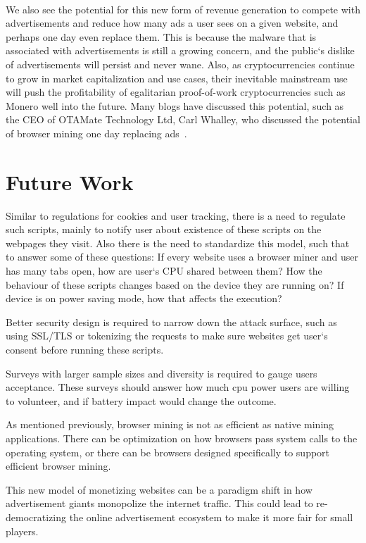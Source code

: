 \\
We also see the potential for this new form of revenue generation to compete with advertisements and reduce how many ads a user sees on a given website, and perhaps one day even replace them. This is because the malware that is associated with advertisements is still a growing concern, and the public`s dislike of advertisements will persist and never wane. Also, as cryptocurrencies continue to grow in market capitalization and use cases, their inevitable mainstream use will push the profitability of egalitarian proof-of-work cryptocurrencies such as Monero well into the future. Many blogs have discussed this potential, such as the CEO of OTAMate Technology Ltd, Carl Whalley, who discussed the potential of browser mining one day replacing ads~\cite{carlcryptoads}.

\section{Future Work}

Similar to regulations for cookies and user tracking, there is a need to regulate such scripts, mainly to notify user about existence of these scripts on the webpages they visit. Also there is the need to standardize this model, such that to answer some of these questions: If every website uses a browser miner and user has many tabs open, how are user`s CPU shared between them? How the behaviour of these scripts changes based on the device they are running on? If device is on power saving mode, how that affects the execution?

Better security design is required to narrow down the attack surface, such as using SSL/TLS or tokenizing the requests to make sure websites get user`s consent before running these scripts. 

Surveys with larger sample sizes and diversity is required to gauge users acceptance. These surveys should answer how much cpu power users are willing to volunteer, and if battery impact would change the outcome.

As mentioned previously, browser mining is not as efficient as native mining applications. There can be optimization on how browsers pass system calls to the operating system, or there can be browsers designed specifically to support efficient browser mining.

This new model of monetizing websites can be a paradigm shift in how advertisement giants monopolize the internet traffic. This could lead to re-democratizing the online advertisement ecosystem to make it more fair for small players.
